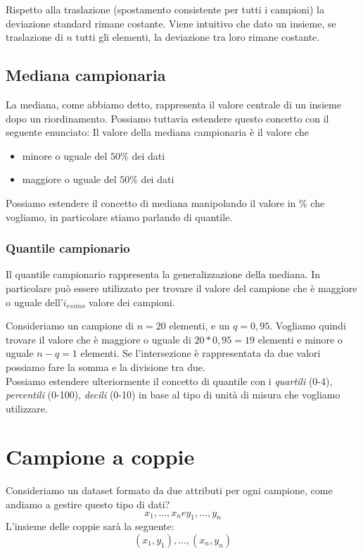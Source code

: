 Rispetto alla traslazione (spostamento consistente per tutti i campioni) la deviazione standard rimane costante. Viene intuitivo che dato un insieme, se traslazione di $n$ tutti gli elementi, la deviazione tra loro rimane costante.

\subsection{Mediana campionaria}
La mediana, come abbiamo detto, rappresenta il valore centrale di un insieme dopo un riordinamento. Possiamo tuttavia estendere questo concetto con il seguente enunciato:
Il valore della mediana campionaria è il valore che \begin{itemize}
\item minore o uguale del $50\%$ dei dati
\item maggiore o uguale del $50\%$ dei dati
\end{itemize}
Possiamo estendere il concetto di mediana manipolando il valore in \% che vogliamo, in particolare stiamo parlando di quantile. 
\subsubsection{Quantile campionario}
Il quantile campionario rappresenta la generalizzazione della mediana. In particolare può essere utilizzato per trovare il valore del campione che è maggiore o uguale dell'$i_{esimo}$ valore dei campioni. 

Consideriamo un campione di $n = 20$ elementi, e un $q = 0,95$. Vogliamo quindi trovare il valore che è maggiore o uguale di $20 * 0,95 = 19$ elementi e minore o uguale $n - q = 1$ elementi. Se l'intersezione è rappresentata da due valori possiamo fare la somma e la divisione tra due.\\

Possiamo estendere ulteriormente il concetto di quantile con i \emph{quartili} (0-4), \emph{percentili} (0-100), \emph{decili} (0-10) in base al tipo di unità di misura che vogliamo utilizzare.

\section{Campione a coppie}
Consideriamo un dataset formato da due attributi per ogni campione, come andiamo a gestire questo tipo di dati?
\begin{equation*}
		x_1, ..., x_n e y_1, ..., y_n
	\end{equation*}
	L'insieme delle coppie sarà la seguente:
\begin{equation*}
		{(x_1, y_1), ..., (x_n, y_n)}
	\end{equation*}
